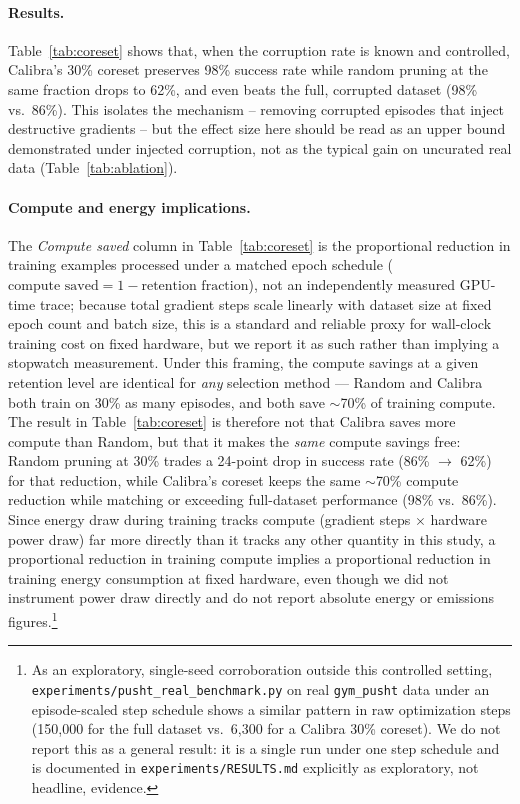 \documentclass[10pt,twocolumn]{article}
\begin{document}
\paragraph{Results.}
Table~\ref{tab:coreset} shows that, when the corruption rate is known and
controlled, Calibra's 30\% coreset preserves 98\% success rate while random
pruning at the same fraction drops to 62\%, and even beats the full,
corrupted dataset (98\% vs.\ 86\%). This isolates the mechanism -- removing
corrupted episodes that inject destructive gradients -- but the effect size
here should be read as an upper bound demonstrated under injected corruption,
not as the typical gain on uncurated real data (Table~\ref{tab:ablation}).

\paragraph{Compute and energy implications.}
The \textit{Compute saved} column in Table~\ref{tab:coreset} is the
proportional reduction in training examples processed under a matched epoch
schedule ($\text{compute saved} = 1 - \text{retention fraction}$), not an
independently measured GPU-time trace; because total gradient steps scale
linearly with dataset size at fixed epoch count and batch size, this is a
standard and reliable proxy for wall-clock training cost on fixed hardware,
but we report it as such rather than implying a stopwatch measurement.
Under this framing, the compute savings at a given retention level are
identical for \emph{any} selection method --- Random and Calibra both train
on 30\% as many episodes, and both save $\sim$70\% of training compute. The
result in Table~\ref{tab:coreset} is therefore not that Calibra saves more
compute than Random, but that it makes the \emph{same} compute savings
free: Random pruning at 30\% trades a 24-point drop in success rate (86\%
$\to$ 62\%) for that reduction, while Calibra's coreset keeps the same
$\sim$70\% compute reduction while matching or exceeding full-dataset
performance (98\% vs.\ 86\%). Since energy draw during training tracks
compute (gradient steps $\times$ hardware power draw) far more directly than
it tracks any other quantity in this study, a proportional reduction in
training compute implies a proportional reduction in training energy
consumption at fixed hardware, even though we did not instrument power
draw directly and do not report absolute energy or emissions figures.\footnote{As
an exploratory, single-seed corroboration outside this controlled setting,
\texttt{experiments/pusht\_real\_benchmark.py} on real \texttt{gym\_pusht}
data under an episode-scaled step schedule shows a similar pattern in raw
optimization steps (150{,}000 for the full dataset vs.\ 6{,}300 for a
Calibra 30\% coreset). We do not report this as a general result: it is a
single run under one step schedule and is documented in
\texttt{experiments/RESULTS.md} explicitly as exploratory, not headline,
evidence.}
\end{document}
